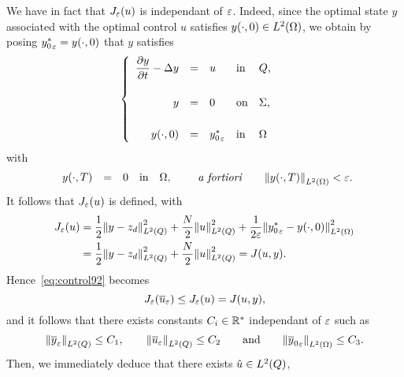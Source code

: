 We have in fact that $J_{\varepsilon}(u)$ is independant of $\varepsilon$. Indeed,
since the optimal state $y$ associated with the optimal control $u$
satisfies ${y}\!\left({\cdot, 0}\right)\in L^{2}\!\left({\Omega}\right)$, we obtain by posing
${y_{0}^{*}}_{\varepsilon} = {y}\!\left({\cdot, 0}\right)$ that $y$ satisfies
\begin{equation*}
    \begin{cases}\displaystyle
        \begin{array}{rclll}
            \dfrac{\partial{}y}{\partial{}t} - \Delta y & = & u & \text{in} & Q,\\
            \\
            y & = & 0 & \text{on} & \Sigma,\\
            \\
            {y}\!\left({\cdot, 0}\right) & = & {y_{0}^{*}}_{\varepsilon} & \text{in} &
            \Omega
        \end{array}
    \end{cases}
\end{equation*}
with
\begin{equation*}
    \begin{array}{rclll}
        {y}\!\left({\cdot,T}\right) & = & 0 & \text{in} & \Omega,
    \end{array}
    \qquad\text{\textit{a fortiori}}\qquad {\left\|{ {y}\!\left({\cdot,T}\right)  }\right\|}_{L^{2}\left({\Omega}\right)} <
    \varepsilon.
\end{equation*}
It follows that $J_{\varepsilon}(u)$ is defined, with
\begin{equation*}
    \begin{split}
        J_{\veps}(u) &= \dfrac{1}{2}\normecq{y - z_{d}} +
        \dfrac{N}{2}\normecq{u} + \dfrac{1}{2\veps}\normecohm{%
            {y_{0}^{*}}_{\veps} - \condinitiale{y}
        }\\
        & = \dfrac{1}{2}\normecq{y - z_{d}} + \dfrac{N}{2}\normecq{u} =
        J(u,y).
    \end{split}
\end{equation*}
Hence~\eqref{eq:control92} becomes
\begin{equation}\label{eq:control95}
    J_{\varepsilon}\!\left({{\overline{u}}_{\varepsilon}}\right) \leq J_{\varepsilon}(u) = J(u,y),
\end{equation}
and it follows that there exists constants $C_{i}\in{\mathbb{R}}^{*}$ independant
of $\varepsilon$ such as
\begin{equation*}
    {\left\|{ {\overline{y}}_{\varepsilon}  }\right\|}_{L^{2}\left({Q}\right)} \leq C_{1},\qquad
    {\left\|{ {\overline{u}}_{\varepsilon}  }\right\|}_{L^{2}\left({Q}\right)}\leq C_{2}\qquad\text{and}\qquad
    {\left\|{{\overline{y}_{0}}_{\varepsilon} }\right\|}_{L^{2}\left({\Omega}\right)}\leq C_{3}.
\end{equation*}
Then, we immediately deduce that there exists $\hat{u}\in L^{2}\!\left({Q}\right)$,
